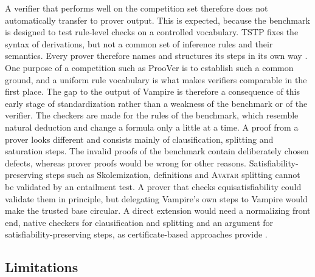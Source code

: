 A verifier that performs well on the competition set therefore does not automatically transfer to prover output. This is expected, because the benchmark is designed to test rule-level checks on a controlled vocabulary. TSTP fixes the syntax of derivations, but not a common set of inference rules and their semantics. Every prover therefore names and structures its steps in its own way \citep{TPTPQuickGuideDerivations}. One purpose of a competition such as ProoVer is to establish such a common ground, and a uniform rule vocabulary is what makes verifiers comparable in the first place. The gap to the output of Vampire is therefore a consequence of this early stage of standardization rather than a weakness of the benchmark or of the verifier.
The checkers are made for the rules of the benchmark, which resemble natural deduction and change a formula only a little at a time.
A proof from a prover looks different and consists mainly of clausification, splitting and saturation steps.
The invalid proofs of the benchmark contain deliberately chosen defects, whereas prover proofs would be wrong for other reasons.
Satisfiability-preserving steps such as Skolemization, definitions and \textsc{Avatar} splitting cannot be validated by an entailment test. A prover that checks equisatisfiability could validate them in principle, but delegating Vampire's own steps to Vampire would make the trusted base circular.
A direct extension would need a normalizing front end, native checkers for clausification and splitting and an argument for satisfiability-preserving steps, as certificate-based approaches provide \citep{Wetzler2014DRATtrim,Carcara2023}.

\subsection{Limitations}
\label{subsec:disc-limitations}

